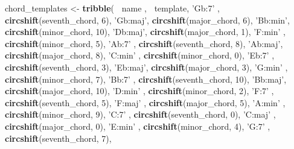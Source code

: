 \documentclass[]{article}
\newenvironment{Shaded}{\begin{snugshade}}{\end{snugshade}}
\newcommand{\DecValTok}[1]{\textcolor[rgb]{0.00,0.00,0.81}{#1}}
\newcommand{\KeywordTok}[1]{\textcolor[rgb]{0.13,0.29,0.53}{\textbf{#1}}}
\newcommand{\NormalTok}[1]{#1}
\newcommand{\OperatorTok}[1]{\textcolor[rgb]{0.81,0.36,0.00}{\textbf{#1}}}
\newcommand{\StringTok}[1]{\textcolor[rgb]{0.31,0.60,0.02}{#1}}
\begin{document}
\begin{Shaded}
\begin{Highlighting}[]
\NormalTok{chord_templates <-}
\StringTok{    }\KeywordTok{tribble}\NormalTok{(}
        \OperatorTok{~}\NormalTok{name  , }\OperatorTok{~}\NormalTok{template,}
        \StringTok{'Gb:7'}\NormalTok{  , }\KeywordTok{circshift}\NormalTok{(seventh_chord,  }\DecValTok{6}\NormalTok{),}
        \StringTok{'Gb:maj'}\NormalTok{, }\KeywordTok{circshift}\NormalTok{(major_chord,    }\DecValTok{6}\NormalTok{),}
        \StringTok{'Bb:min'}\NormalTok{, }\KeywordTok{circshift}\NormalTok{(minor_chord,   }\DecValTok{10}\NormalTok{),}
        \StringTok{'Db:maj'}\NormalTok{, }\KeywordTok{circshift}\NormalTok{(major_chord,    }\DecValTok{1}\NormalTok{),}
        \StringTok{'F:min'}\NormalTok{ , }\KeywordTok{circshift}\NormalTok{(minor_chord,    }\DecValTok{5}\NormalTok{),}
        \StringTok{'Ab:7'}\NormalTok{  , }\KeywordTok{circshift}\NormalTok{(seventh_chord,  }\DecValTok{8}\NormalTok{),}
        \StringTok{'Ab:maj'}\NormalTok{, }\KeywordTok{circshift}\NormalTok{(major_chord,    }\DecValTok{8}\NormalTok{),}
        \StringTok{'C:min'}\NormalTok{ , }\KeywordTok{circshift}\NormalTok{(minor_chord,    }\DecValTok{0}\NormalTok{),}
        \StringTok{'Eb:7'}\NormalTok{  , }\KeywordTok{circshift}\NormalTok{(seventh_chord,  }\DecValTok{3}\NormalTok{),}
        \StringTok{'Eb:maj'}\NormalTok{, }\KeywordTok{circshift}\NormalTok{(major_chord,    }\DecValTok{3}\NormalTok{),}
        \StringTok{'G:min'}\NormalTok{ , }\KeywordTok{circshift}\NormalTok{(minor_chord,    }\DecValTok{7}\NormalTok{),}
        \StringTok{'Bb:7'}\NormalTok{  , }\KeywordTok{circshift}\NormalTok{(seventh_chord, }\DecValTok{10}\NormalTok{),}
        \StringTok{'Bb:maj'}\NormalTok{, }\KeywordTok{circshift}\NormalTok{(major_chord,   }\DecValTok{10}\NormalTok{),}
        \StringTok{'D:min'}\NormalTok{ , }\KeywordTok{circshift}\NormalTok{(minor_chord,    }\DecValTok{2}\NormalTok{),}
        \StringTok{'F:7'}\NormalTok{   , }\KeywordTok{circshift}\NormalTok{(seventh_chord,  }\DecValTok{5}\NormalTok{),}
        \StringTok{'F:maj'}\NormalTok{ , }\KeywordTok{circshift}\NormalTok{(major_chord,    }\DecValTok{5}\NormalTok{),}
        \StringTok{'A:min'}\NormalTok{ , }\KeywordTok{circshift}\NormalTok{(minor_chord,    }\DecValTok{9}\NormalTok{),}
        \StringTok{'C:7'}\NormalTok{   , }\KeywordTok{circshift}\NormalTok{(seventh_chord,  }\DecValTok{0}\NormalTok{),}
        \StringTok{'C:maj'}\NormalTok{ , }\KeywordTok{circshift}\NormalTok{(major_chord,    }\DecValTok{0}\NormalTok{),}
        \StringTok{'E:min'}\NormalTok{ , }\KeywordTok{circshift}\NormalTok{(minor_chord,    }\DecValTok{4}\NormalTok{),}
        \StringTok{'G:7'}\NormalTok{   , }\KeywordTok{circshift}\NormalTok{(seventh_chord,  }\DecValTok{7}\NormalTok{),}

\end{Highlighting}
\end{Shaded}
\end{document}
